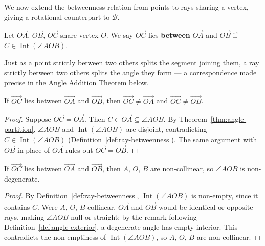 \documentclass[../../../main/main.tex]{subfiles}
\begin{document}
We now extend the betweenness relation from points to rays sharing a vertex, giving a rotational counterpart to $\mathcal{B}$.

\begin{definition}\label{def:ray-betweenness}
Let $\overrightarrow{OA}$, $\overrightarrow{OB}$, $\overrightarrow{OC}$ share vertex $O$. We say $\overrightarrow{OC}$ lies \textbf{between} $\overrightarrow{OA}$ and $\overrightarrow{OB}$ if $C \in \operatorname{Int}(\angle AOB)$.
\end{definition}

Just as a point strictly between two others splits the segment joining them, a ray strictly between two others splits the angle they form --- a correspondence made precise in the Angle Addition Theorem below.

\begin{theorem}\label{thm:ray-between-asym}
If $\overrightarrow{OC}$ lies between $\overrightarrow{OA}$ and $\overrightarrow{OB}$, then $\overrightarrow{OC} \neq \overrightarrow{OA}$ and $\overrightarrow{OC} \neq \overrightarrow{OB}$.
\end{theorem}
\begin{proof}
Suppose $\overrightarrow{OC} = \overrightarrow{OA}$. Then $C \in \overrightarrow{OA} \subseteq \angle AOB$. By Theorem~\ref{thm:angle-partition}, $\angle AOB$ and $\operatorname{Int}(\angle AOB)$ are disjoint, contradicting $C \in \operatorname{Int}(\angle AOB)$ (Definition~\ref{def:ray-betweenness}). The same argument with $\overrightarrow{OB}$ in place of $\overrightarrow{OA}$ rules out $\overrightarrow{OC} = \overrightarrow{OB}$.
\end{proof}

\begin{theorem}\label{thm:ray-between-nondegen}
If $\overrightarrow{OC}$ lies between $\overrightarrow{OA}$ and $\overrightarrow{OB}$, then $A$, $O$, $B$ are non-collinear, so $\angle AOB$ is non-degenerate.
\end{theorem}
\begin{proof}
By Definition~\ref{def:ray-betweenness}, $\operatorname{Int}(\angle AOB)$ is non-empty, since it contains $C$. Were $A$, $O$, $B$ collinear, $\overrightarrow{OA}$ and $\overrightarrow{OB}$ would be identical or opposite rays, making $\angle AOB$ null or straight; by the remark following Definition~\ref{def:angle-exterior}, a degenerate angle has empty interior. This contradicts the non-emptiness of $\operatorname{Int}(\angle AOB)$, so $A$, $O$, $B$ are non-collinear.
\end{proof}
\end{document}
